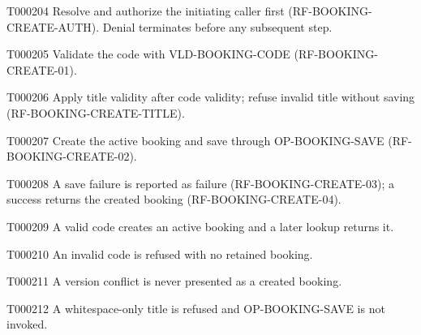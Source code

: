 \documentclass[11pt,a4paper]{article}
\begin{document}
\begin{atlasparagraph}{T000204}
Resolve and authorize the initiating caller first (RF-BOOKING-CREATE-AUTH). Denial terminates before any subsequent step.
\end{atlasparagraph}
\begin{atlasparagraph}{T000205}
Validate the code with VLD-BOOKING-CODE (RF-BOOKING-CREATE-01).
\end{atlasparagraph}
\begin{atlasparagraph}{T000206}
Apply title validity after code validity; refuse invalid title without saving (RF-BOOKING-CREATE-TITLE).
\end{atlasparagraph}
\begin{atlasparagraph}{T000207}
Create the active booking and save through OP-BOOKING-SAVE (RF-BOOKING-CREATE-02).
\end{atlasparagraph}
\begin{atlasparagraph}{T000208}
A save failure is reported as failure (RF-BOOKING-CREATE-03); a success returns the created booking (RF-BOOKING-CREATE-04).
\end{atlasparagraph}
\begin{atlasparagraph}{T000209}
A valid code creates an active booking and a later lookup returns it.
\end{atlasparagraph}
\begin{atlasparagraph}{T000210}
An invalid code is refused with no retained booking.
\end{atlasparagraph}
\begin{atlasparagraph}{T000211}
A version conflict is never presented as a created booking.
\end{atlasparagraph}
\begin{atlasparagraph}{T000212}
A whitespace-only title is refused and OP-BOOKING-SAVE is not invoked.
\end{atlasparagraph}
\end{document}
